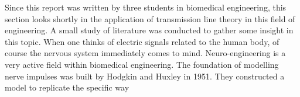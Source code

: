 Since this report was written by three students in biomedical engineering, this section looks shortly in the application of transmission line theory in this field of engineering. A small study of literature was conducted to gather some insight in this topic.
When one thinks of electric signals related to the human body, of course the nervous system immediately comes to mind. Neuro-engineering is a very active field within biomedical engineering. The foundation of modelling nerve impulses was built by Hodgkin and Huxley in 1951. They constructed a model to replicate the specific way

